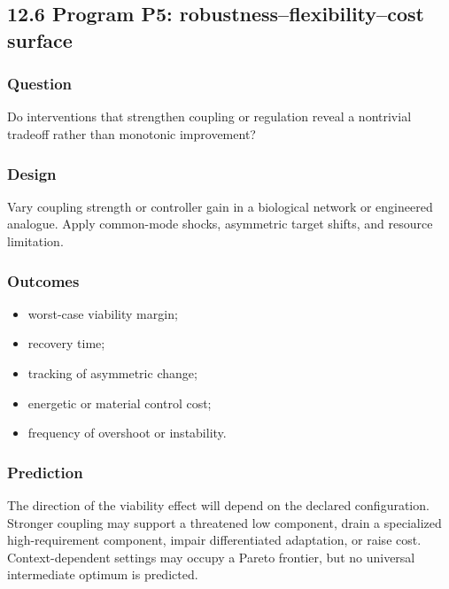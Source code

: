 \documentclass[
  11pt,
]{article}
\providecommand{\tightlist}{%
  \setlength{\itemsep}{0pt}\setlength{\parskip}{0pt}}
\begin{document}
\subsection{12.6 Program P5: robustness--flexibility--cost
surface}\label{program-p5-robustnessflexibilitycost-surface}

\subsubsection{Question}\label{question-4}

Do interventions that strengthen coupling or regulation reveal a
nontrivial tradeoff rather than monotonic improvement?

\subsubsection{Design}\label{design-4}

Vary coupling strength or controller gain in a biological network or
engineered analogue. Apply common-mode shocks, asymmetric target shifts,
and resource limitation.

\subsubsection{Outcomes}\label{outcomes}

\begin{itemize}
\tightlist
\item
  worst-case viability margin;
\item
  recovery time;
\item
  tracking of asymmetric change;
\item
  energetic or material control cost;
\item
  frequency of overshoot or instability.
\end{itemize}

\subsubsection{Prediction}\label{prediction}

The direction of the viability effect will depend on the declared
configuration. Stronger coupling may support a threatened low component,
drain a specialized high-requirement component, impair differentiated
adaptation, or raise cost. Context-dependent settings may occupy a
Pareto frontier, but no universal intermediate optimum is predicted.
\end{document}
